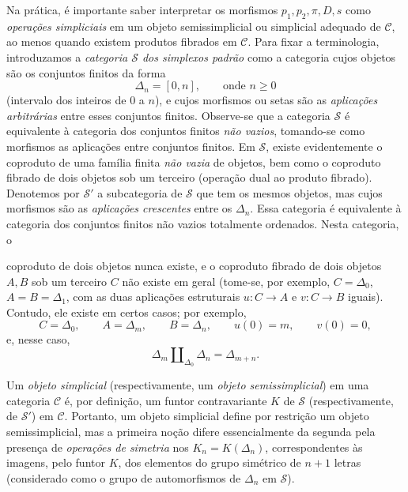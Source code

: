 \documentclass[11pt,twoside,openany]{book}
\numberwithin{equation}{section}
\newcommand{\src}[1]{%
  \phantomsection\hypertarget{src:#1}{}%
  \marginpar{\raggedleft\footnotesize\sffamily #1}%
}
\theoremstyle{plain}
\theoremstyle{definition}
\theoremstyle{remark}
\newcommand{\FgaUnitKey}{frontmatter}
\renewcommand{\src}[1]{%
  \phantomsection\hypertarget{src:\FgaUnitKey:#1}{}%
  \marginpar{\raggedleft\footnotesize\sffamily #1}%
}
\begin{document}
Na prática, é importante saber interpretar os morfismos
$p_1,p_2,\pi,D,s$ como \emph{operações simpliciais} em um objeto
semissimplicial ou simplicial adequado de $\mathcal C$, ao menos quando
existem produtos fibrados em $\mathcal C$. Para fixar a terminologia,
introduzamos a \emph{categoria $\mathcal S$ dos simplexos padrão} como a
categoria cujos objetos são os conjuntos finitos da forma
\[
  \Delta_n=[0,n],\qquad\text{onde }n\geq 0
\]
(intervalo dos inteiros de $0$ a $n$), e cujos morfismos ou setas são as
\emph{aplicações arbitrárias} entre esses conjuntos finitos. Observe-se que a
categoria $\mathcal S$ é equivalente à categoria dos conjuntos finitos
\emph{não vazios}, tomando-se como morfismos as aplicações entre conjuntos
finitos. Em $\mathcal S$, existe evidentemente o coproduto de uma família
finita \emph{não vazia} de objetos, bem como o coproduto fibrado de dois
objetos sob um terceiro (operação dual ao produto fibrado). Denotemos por
$\mathcal S'$ a subcategoria de $\mathcal S$ que tem os mesmos objetos, mas
cujos morfismos são as \emph{aplicações crescentes} entre os $\Delta_n$. Essa
categoria é equivalente à categoria dos conjuntos finitos não vazios
totalmente ordenados. Nesta categoria, o
\src{108}
coproduto de dois objetos nunca existe, e o coproduto fibrado de dois objetos
$A,B$ sob um terceiro $C$ não existe em geral (tome-se, por exemplo,
$C=\Delta_0$, $A=B=\Delta_1$, com as duas aplicações estruturais
$u:C\to A$ e $v:C\to B$ iguais). Contudo, ele existe em certos casos; por
exemplo,
\[
  C=\Delta_0,\qquad A=\Delta_m,\qquad B=\Delta_n,\qquad
  u(0)=m,\qquad v(0)=0,
\]
e, nesse caso,
\[
  \Delta_m\amalg_{\Delta_0}\Delta_n=\Delta_{m+n}.
\]

Um \emph{objeto simplicial} (respectivamente, um \emph{objeto
semissimplicial}) em uma categoria $\mathcal C$ é, por definição, um funtor
contravariante $K$ de $\mathcal S$ (respectivamente, de $\mathcal S'$) em
$\mathcal C$. Portanto, um objeto simplicial define por restrição um objeto
semissimplicial, mas a primeira noção difere essencialmente da segunda pela
presença de \emph{operações de simetria} nos $K_n=K(\Delta_n)$,
correspondentes às imagens, pelo funtor $K$, dos elementos do grupo simétrico
de $n+1$ letras (considerado como o grupo de automorfismos de $\Delta_n$ em
$\mathcal S$).
\end{document}
